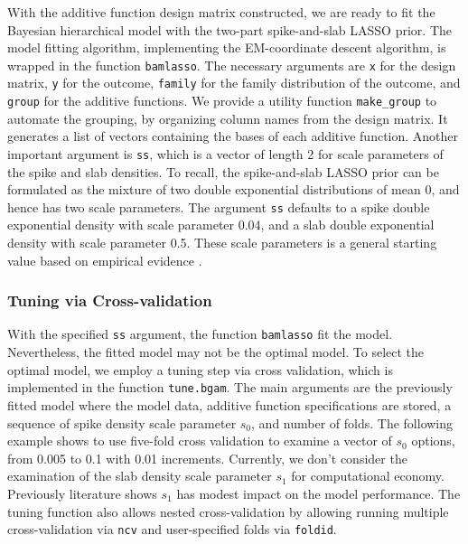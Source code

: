 \documentclass[
]{jss}
\begin{document}
With the additive function design matrix constructed, we are ready to
fit the Bayesian hierarchical model with the two-part spike-and-slab
LASSO prior. The model fitting algorithm, implementing the EM-coordinate
descent algorithm, is wrapped in the function \texttt{bamlasso}. The
necessary arguments are \texttt{x} for the design matrix, \texttt{y} for
the outcome, \texttt{family} for the family distribution of the outcome,
and \texttt{group} for the additive functions. We provide a utility
function \texttt{make\_group} to automate the grouping, by organizing
column names from the design matrix. It generates a list of vectors
containing the bases of each additive function. Another important
argument is \texttt{ss}, which is a vector of length 2 for scale
parameters of the spike and slab densities. To recall, the
spike-and-slab LASSO prior can be formulated as the mixture of two
double exponential distributions of mean 0, and hence has two scale
parameters. The argument \texttt{ss} defaults to a spike double
exponential density with scale parameter 0.04, and a slab double
exponential density with scale parameter 0.5. These scale parameters is
a general starting value based on empirical evidence
\citep{Tang2018, Tang2019}.

\begin{CodeChunk}
\end{CodeChunk}

\subsubsection{Tuning via Cross-validation}

With the specified \texttt{ss} argument, the function \texttt{bamlasso}
fit the model. Nevertheless, the fitted model may not be the optimal
model. To select the optimal model, we employ a tuning step via cross
validation, which is implemented in the function \texttt{tune.bgam}. The
main arguments are the previously fitted model where the model data,
additive function specifications are stored, a sequence of spike density
scale parameter \(s_0\), and number of folds. The following example
shows to use five-fold cross validation to examine a vector of \(s_0\)
options, from 0.005 to 0.1 with 0.01 increments. Currently, we don't
consider the examination of the slab density scale parameter \(s_1\) for
computational economy. Previously literature \citep{tang2017, Tang2017a}
shows \(s_1\) has modest impact on the model performance. The tuning
function also allows nested cross-validation by allowing running
multiple cross-validation via \texttt{ncv} and user-specified folds via
\texttt{foldid}.
\end{document}
